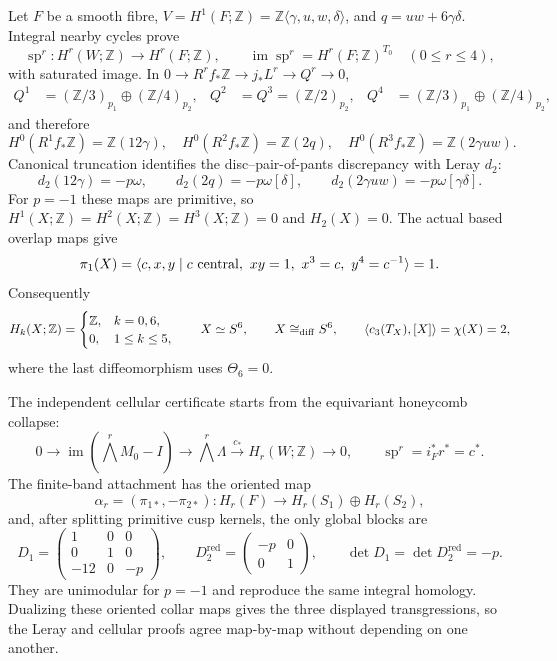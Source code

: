 \documentclass[10pt,letterpaper]{article}
\begin{document}
Let $F$ be a smooth fibre,
$V=H^1(F;\mathbb Z)=\mathbb Z\langle\gamma,u,w,\delta\rangle$, and
$q=uw+6\gamma\delta$.  Integral nearby cycles prove
\[
 \operatorname{sp}^r:H^r(W;\mathbb Z)\longrightarrow H^r(F;\mathbb Z),
 \qquad \operatorname{im}\operatorname{sp}^r
 =H^r(F;\mathbb Z)^{T_0}\quad(0\le r\le4),
\]
with saturated image.  In
$0\to R^rf_*\mathbb Z\to j_*L^r\to Q^r\to0$,
\[
 \begin{aligned}
 Q^1&=(\mathbb Z/3)_{p_1}\oplus(\mathbb Z/4)_{p_2},&
 Q^2&=Q^3=(\mathbb Z/2)_{p_2},&
 Q^4&=(\mathbb Z/3)_{p_1}\oplus(\mathbb Z/4)_{p_2},
 \end{aligned}
\]
and therefore
\[
 H^0(R^1f_*\mathbb Z)=\mathbb Z(12\gamma),\quad
 H^0(R^2f_*\mathbb Z)=\mathbb Z(2q),\quad
 H^0(R^3f_*\mathbb Z)=\mathbb Z(2\gamma uw).
\]
Canonical truncation identifies the disc--pair-of-pants discrepancy with
Leray $d_2$:
\[
 d_2(12\gamma)=-p\omega,\qquad
 d_2(2q)=-p\omega[\delta],\qquad
 d_2(2\gamma uw)=-p\omega[\gamma\delta].
\]
For $p=-1$ these maps are primitive, so
$H^1(X;\mathbb Z)=H^2(X;\mathbb Z)=H^3(X;\mathbb Z)=0$ and $H_2(X)=0$.
The actual based overlap maps give
\[
 \pi_1(X)=
 \langle c,x,y\mid c\ {\rm central},\ xy=1,\ x^3=c,\ y^4=c^{-1}\rangle=1.
\]
Consequently
\[
 H_k(X;\mathbb Z)=
 \begin{cases}\mathbb Z,&k=0,6,\\0,&1\le k\le5,\end{cases}
 \qquad X\simeq S^6,\qquad
 X\cong_{\rm diff}S^6,\qquad
 \langle c_3(T_X),[X]\rangle=\chi(X)=2,
\]
where the last diffeomorphism uses $\Theta_6=0$.

The independent cellular certificate starts from the equivariant honeycomb
collapse:
\[
 0\longrightarrow\operatorname{im}(\textstyle\bigwedge^rM_0-I)
 \longrightarrow\textstyle\bigwedge^r\Lambda
 \xrightarrow{c_*}H_r(W;\mathbb Z)\longrightarrow0,\qquad
 \operatorname{sp}^r=i_F^*r^*=c^*.
\]
The finite-band attachment has the oriented map
\[
 \alpha_r=(\pi_{1*},-\pi_{2*}):
 H_r(F)\longrightarrow H_r(S_1)\oplus H_r(S_2),
\]
and, after splitting primitive cusp kernels, the only global blocks are
\[
 D_1=\begin{pmatrix}1&0&0\\0&1&0\\-12&0&-p\end{pmatrix},\qquad
 D_2^{\mathrm{red}}=\begin{pmatrix}-p&0\\0&1\end{pmatrix},\qquad
 \det D_1=\det D_2^{\mathrm{red}}=-p.
\]
They are unimodular for $p=-1$ and reproduce the same integral homology.
Dualizing these oriented collar maps gives the three displayed
transgressions, so the Leray and cellular proofs agree map-by-map without
depending on one another.
\end{document}
